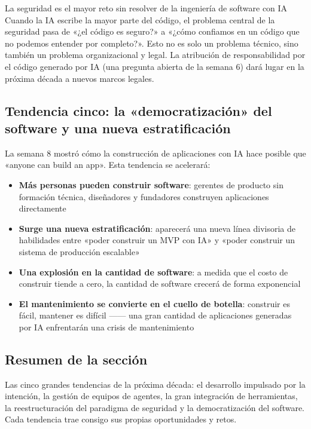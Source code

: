 \begin{warningbox}{La seguridad es el mayor reto sin resolver de la ingeniería de software con IA}
Cuando la IA escribe la mayor parte del código, el problema central de la seguridad pasa de «¿el código es seguro?» a «¿cómo confiamos en un código que no podemos entender por completo?». Esto no es solo un problema técnico, sino también un problema organizacional y legal. La atribución de responsabilidad por el código generado por IA (una pregunta abierta de la semana 6) dará lugar en la próxima década a nuevos marcos legales.
\end{warningbox}

\subsection{Tendencia cinco: la «democratización» del software y una nueva estratificación}

La semana 8 mostró cómo la construcción de aplicaciones con IA hace posible que «anyone can build an app». Esta tendencia se acelerará:

\begin{itemize}
    \item \textbf{Más personas pueden construir software}: gerentes de producto sin formación técnica, diseñadores y fundadores construyen aplicaciones directamente
    \item \textbf{Surge una nueva estratificación}: aparecerá una nueva línea divisoria de habilidades entre «poder construir un MVP con IA» y «poder construir un sistema de producción escalable»
    \item \textbf{Una explosión en la cantidad de software}: a medida que el costo de construir tiende a cero, la cantidad de software crecerá de forma exponencial
    \item \textbf{El mantenimiento se convierte en el cuello de botella}: construir es fácil, mantener es difícil —— una gran cantidad de aplicaciones generadas por IA enfrentarán una crisis de mantenimiento
\end{itemize}

\subsection{Resumen de la sección}

Las cinco grandes tendencias de la próxima década: el desarrollo impulsado por la intención, la gestión de equipos de agentes, la gran integración de herramientas, la reestructuración del paradigma de seguridad y la democratización del software. Cada tendencia trae consigo sus propias oportunidades y retos.
